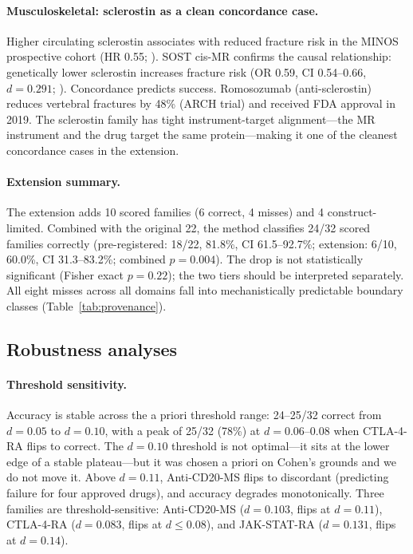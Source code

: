 \documentclass[11pt]{article}
\begin{document}
\paragraph{Musculoskeletal: sclerostin as a clean concordance case.}
Higher circulating sclerostin associates with reduced fracture risk in the MINOS prospective cohort (HR 0.55; \cite{szulc2014}). SOST cis-MR confirms the causal relationship: genetically lower sclerostin increases fracture risk (OR 0.59, CI 0.54--0.66, $d = 0.291$; \cite{bovijn2020}). Concordance predicts success. Romosozumab (anti-sclerostin) reduces vertebral fractures by 48\% (ARCH trial) and received FDA approval in 2019. The sclerostin family has tight instrument-target alignment---the MR instrument and the drug target the same protein---making it one of the cleanest concordance cases in the extension.

\paragraph{Extension summary.}
The extension adds 10 scored families (6 correct, 4 misses) and 4 construct-limited. Combined with the original 22, the method classifies 24/32 scored families correctly (pre-registered: 18/22, 81.8\%, CI 61.5--92.7\%; extension: 6/10, 60.0\%, CI 31.3--83.2\%; combined $p = 0.004$). The drop is not statistically significant (Fisher exact $p = 0.22$); the two tiers should be interpreted separately. All eight misses across all domains fall into mechanistically predictable boundary classes (Table~\ref{tab:provenance}).

\subsection{Robustness analyses}
\label{sec:robustness}

\paragraph{Threshold sensitivity.} Accuracy is stable across the a priori threshold range: 24--25/32 correct from $d = 0.05$ to $d = 0.10$, with a peak of 25/32 (78\%) at $d = 0.06$--$0.08$ when CTLA-4-RA flips to correct. The $d = 0.10$ threshold is not optimal---it sits at the lower edge of a stable plateau---but it was chosen a priori on Cohen's grounds and we do not move it. Above $d = 0.11$, Anti-CD20-MS flips to discordant (predicting failure for four approved drugs), and accuracy degrades monotonically. Three families are threshold-sensitive: Anti-CD20-MS ($d = 0.103$, flips at $d = 0.11$), CTLA-4-RA ($d = 0.083$, flips at $d \leq 0.08$), and JAK-STAT-RA ($d = 0.131$, flips at $d = 0.14$).
\end{document}
